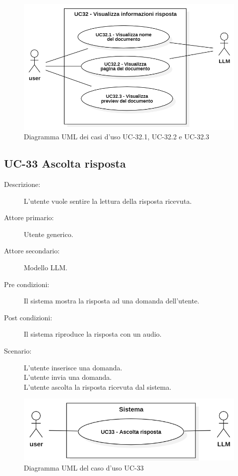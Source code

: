 \begin{figure}[H]
    \centering
    \includegraphics[width=0.9\linewidth]{UC32.1-2-3.PNG}
    \caption{Diagramma UML dei casi d'uso UC-32.1, UC-32.2 e UC-32.3}
    \label{fig:UC32.1-2-3}
\end{figure}

\subsection{UC-33 Ascolta risposta}
\begin{description}
    \item[Descrizione:] L'utente vuole sentire la lettura della risposta ricevuta.
    \item[Attore primario:] Utente generico.
    \item[Attore secondario:] Modello LLM.
    \item[Pre condizioni:] Il sistema mostra la risposta ad una domanda dell'utente.
    \item[Post condizioni:] Il sistema riproduce la risposta con un audio.
    \item[Scenario:] L'utente inserisce una domanda.\\L'utente invia una domanda.\\L'utente ascolta la risposta ricevuta dal sistema.
\end{description}

\begin{figure}[H]
    \centering
    \includegraphics[width=0.9\linewidth]{UC33.PNG}
    \caption{Diagramma UML del caso d'uso UC-33}
    \label{fig:UC33}
\end{figure}
